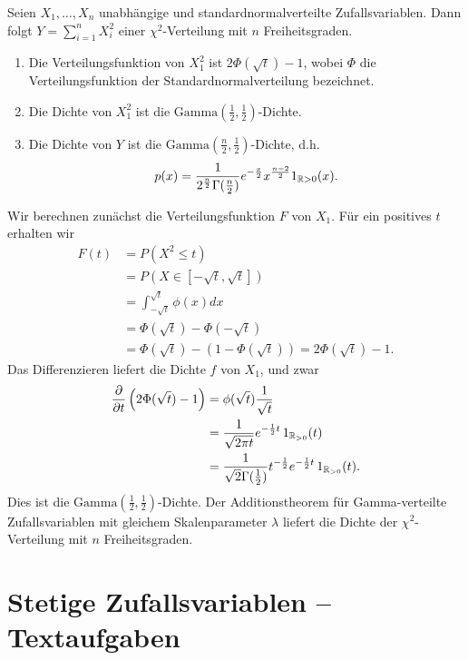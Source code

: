 Seien $X_1,\ldots,X_n$ unabhängige und standardnormalverteilte
Zufallsvariablen. Dann folgt $Y= \sum_{i=1}^{n} X_i^2$ einer
$\chi^2$-Verteilung mit $n$ Freiheitsgraden. 
\begin{enumerate}
    \item Die Verteilungsfunktion von $X_1^2$ ist $2\Phi(\sqrt{t})-1$, wobei
        $\Phi$ die Verteilungsfunktion der Standardnormalverteilung bezeichnet. 
    \item Die Dichte von $X_1^2$ ist die $\text{Gamma}(\frac{1}{2},\frac{1}{2})$-Dichte. 
    \item Die Dichte von $Y$ ist die $\text{Gamma}(\frac{n}{2},\frac{1}{2})$-Dichte, d.h.\
        \begin{equation*}
            p(x) = \frac{1}{ 2^{\frac{n}{2}} 
            \Gamma(\frac{n}{2})}e^{-\frac{x}{2}} x^{\frac{n-2}{2}} 1_{\mathbb{R}>0}(x).
        \end{equation*}
\end{enumerate}
\solution
Wir berechnen zunächst die Verteilungsfunktion $F$ von $X_1$. Für ein positives $t$
erhalten wir
\begin{align*}
    F(t) &= P \left( X^2 \leq t \right) \\
    &= P \left( X \in \left[ -\sqrt{t}, \sqrt{t} \right]  \right) \\
    &= \int_{-\sqrt{t}}^{\sqrt{t}} \phi(x) dx \\
    &= \Phi(\sqrt{t}) - \Phi(-\sqrt{t}) \\
    &= \Phi(\sqrt{t}) - (1 - \Phi(\sqrt{t})) = 2 \Phi(\sqrt{t}) -1. 
\end{align*}
Das Differenzieren liefert die Dichte $f$ von $X_1$, und zwar
\begin{align*}
    \frac{\partial}{\partial t} \left( 2 \Phi(\sqrt{t}) - 1 \right) 
    &= \phi(\sqrt{t}) \frac{1}{\sqrt{t}} \\
    &= \frac{1}{\sqrt{2\pi t}} e^{-\frac{1}{2}t} \, 1_{\mathbb{R}_{>0}}(t) \\
    &= \frac{1}{\sqrt{2}\Gamma(\frac{1}{2})} t^{-\frac{1}{2}} e^{-\frac{1}{2}t} \, 1_{\mathbb{R}_{>0}}(t).
\end{align*}
Dies ist die $\text{Gamma}(\frac{1}{2}, \frac{1}{2})$-Dichte. Der
Additionstheorem für Gamma-verteilte Zufallsvariablen mit gleichem
Skalenparameter $\lambda$ liefert die Dichte der $\chi^{2}$-Verteilung mit $n$
Freiheitsgraden. 



\section{Stetige Zufallsvariablen -- Textaufgaben}

